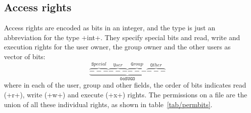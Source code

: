 
\subsection*{Access rights}

Access rights are encoded as bits in an integer, and the type
 is just an abbreviation for the type
\ml+int+. They specify special bits and read, write and
execution rights for the user owner, the group owner and the other
users as vector of bits:
%
{%
\begin{displaymath}
\underbrace
{\overbrace{---}^{\texttt Special}
 \overbrace{---}^{\texttt User}
 \overbrace{---}^{\texttt Group}
 \overbrace{---}^{\texttt Other}}_{\texttt{0oSUGO}}
\end{displaymath}
}
% 
where in each of the user, group and other fields, the order of bits
indicates read (\ml+r+), write (\ml+w+) and execute (\ml+x+) rights.
The permissions on a file are the union of all these individual
rights, as shown in table~\ref{tab/permbits}.

